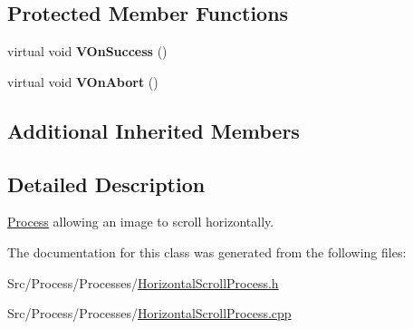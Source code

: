 \subsection*{Protected Member Functions}
\begin{DoxyCompactItemize}
\item 
\hypertarget{classHorizontalScrollProcess_aad8ea70048a39e29034929d9027a54a9}{virtual void {\bfseries V\-On\-Success} ()}\label{classHorizontalScrollProcess_aad8ea70048a39e29034929d9027a54a9}

\item 
\hypertarget{classHorizontalScrollProcess_a41debd20b79ec69394d2640b9659f711}{virtual void {\bfseries V\-On\-Abort} ()}\label{classHorizontalScrollProcess_a41debd20b79ec69394d2640b9659f711}

\end{DoxyCompactItemize}
\subsection*{Additional Inherited Members}


\subsection{Detailed Description}
\hyperlink{classProcess}{Process} allowing an image to scroll horizontally. 

The documentation for this class was generated from the following files\-:\begin{DoxyCompactItemize}
\item 
Src/\-Process/\-Processes/\hyperlink{HorizontalScrollProcess_8h}{Horizontal\-Scroll\-Process.\-h}\item 
Src/\-Process/\-Processes/\hyperlink{HorizontalScrollProcess_8cpp}{Horizontal\-Scroll\-Process.\-cpp}\end{DoxyCompactItemize}

